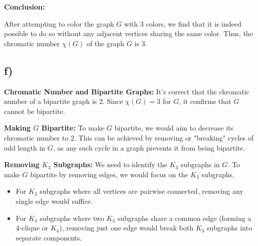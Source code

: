 \documentclass[12pt]{article}
\begin{document}

\textbf{Conclusion:}

After attempting to color the graph \( G \) with 3 colors, we find that it is indeed possible to do so without any adjacent vertices sharing the same color. Thus, the chromatic number \( \chi(G) \) of the graph \( G \) is 3.


\subsection*{f)}

\textbf{Chromatic Number and Bipartite Graphs:} It's correct that the chromatic number of a bipartite graph is 2. Since \( \chi(G) = 3 \) for \( G \), it confirms that \( G \) cannot be bipartite.

\textbf{Making \( G \) Bipartite:} To make \( G \) bipartite, we would aim to decrease its chromatic number to 2. This can be achieved by removing or "breaking" cycles of odd length in \( G \), as any such cycle in a graph prevents it from being bipartite.

\textbf{Removing \( K_3 \) Subgraphs:} We need to identify the \( K_3 \) subgraphs in \( G \). To make \( G \) bipartite by removing edges, we would focus on the \( K_3 \) subgraphs.

\begin{itemize}
    \item For \( K_3 \) subgraphs where all vertices are pairwise connected, removing any single edge would suffice.
    
    \item For \( K_3 \) subgraphs where two \( K_3 \) subgraphs share a common edge (forming a 4-clique or \( K_4 \)), removing just one edge would break both \( K_3 \) subgraphs into separate components.
\end{itemize}
\end{document}
